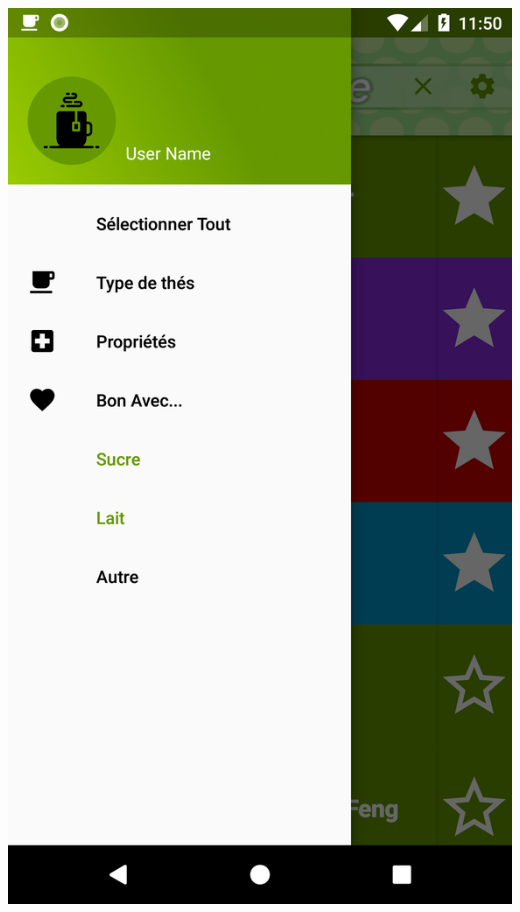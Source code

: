 \documentclass[a4paper,12pt]{article}
\begin{document}
\begin{spacing}{1}
	\includegraphics*[scale=0.1]{Screenshot/17.png}    

\end{spacing}
\end{document}
